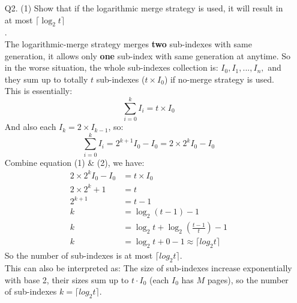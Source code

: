 \documentclass[12pt, letterpaper, twoside]{article}
\begin{document}
\begin{enumerate}
    \item[Q2.]
        (1) Show that if the logarithmic merge strategy is used, it will result in at most $\lceil \log_2 t \rceil$\\.\\
        The logarithmic-merge strategy merges \textbf{two} sub-indexes with same generation, it allows only \textbf{one} sub-index with same generation at anytime. So in the worse situation, the whole sub-indexes collection is: $I_0, I_1, ... , I_n,$ and they sum up to totally $t$ sub-indexes ($t\times I_0$) if no-merge strategy is used.\\
        This is essentially:\\
        \begin{equation}
            \sum_{i = 0}^{k}I_i = t \times I_0
        \end{equation}
        And also each $I_k = 2 \times I_{k-1}$, so:
        \begin{equation}
            \sum_{i = 0}^{k}I_i = 2^{k+1}I_0-I_0 = 2\times 2^kI_0-I_0
        \end{equation}
        Combine equation (1) \& (2), we have:\\
        \begin{equation}
        \begin{split}
            2\times 2^kI_0-I_0 & = t \times I_0\\
            2\times 2^k + 1 & = t\\
            2^{k+1} & = t - 1\\
            k & = \log_2 (t-1) - 1\\
            k & = \log_2 t + \log_2 (\frac{t-1}{t})-1\\
            k & = \log_2 t + 0 - 1 \approx \lceil log_2 t \rceil
        \end{split}
        \end{equation}
        So the number of sub-indexes is at most $\lceil log_2 t \rceil$.\\
        This can also be interpreted as: The size of sub-indexes increase exponentially with base 2, their sizes sum up to $t\cdot I_0$ (each $I_0$ has $M$ pages), so the number of sub-indexes $k = \lceil log_2 t \rceil$.\\


\end{enumerate}
\end{document}

